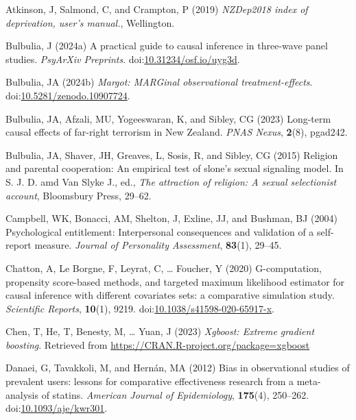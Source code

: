 \documentclass[
  single column]{article}
\newlength{\cslhangindent}
\newenvironment{CSLReferences}[2] %
 {\begin{list}{}{%
  \setlength{\itemindent}{0pt}
  \setlength{\leftmargin}{0pt}
  \setlength{\parsep}{0pt}
  \ifodd #1
   \setlength{\leftmargin}{\cslhangindent}
   \setlength{\itemindent}{-1\cslhangindent}
  \fi
  \setlength{\itemsep}{#2\baselineskip}}}
 {\end{list}}
\begin{document}
\label{refs}
\begin{CSLReferences}{1}{0}
Atkinson, J, Salmond, C, and Crampton, P (2019) \emph{NZDep2018 index of
deprivation, user{'}s manual.}, Wellington.

Bulbulia, J (2024a) A practical guide to causal inference in three-wave
panel studies. \emph{PsyArXiv Preprints}.
doi:\href{https://doi.org/10.31234/osf.io/uyg3d}{10.31234/osf.io/uyg3d}.

Bulbulia, JA (2024b) \emph{Margot: MARGinal observational
treatment-effects}.
doi:\href{https://doi.org/10.5281/zenodo.10907724}{10.5281/zenodo.10907724}.

Bulbulia, JA, Afzali, MU, Yogeeswaran, K, and Sibley, CG (2023)
Long-term causal effects of far-right terrorism in {N}ew {Z}ealand.
\emph{PNAS Nexus}, \textbf{2}(8), pgad242.

Bulbulia, JA, Shaver, JH, Greaves, L, Sosis, R, and Sibley, CG (2015)
Religion and parental cooperation: An empirical test of slone's sexual
signaling model. In S. J. D. amd Van Slyke J., ed., \emph{The attraction
of religion: A sexual selectionist account}, Bloomsbury Press, 29--62.

Campbell, WK, Bonacci, AM, Shelton, J, Exline, JJ, and Bushman, BJ
(2004) Psychological entitlement: Interpersonal consequences and
validation of a self-report measure. \emph{Journal of Personality
Assessment}, \textbf{83}(1), 29--45.

Chatton, A, Le Borgne, F, Leyrat, C, \ldots{} Foucher, Y (2020)
G-computation, propensity score-based methods, and targeted maximum
likelihood estimator for causal inference with different covariates
sets: a comparative simulation study. \emph{Scientific Reports},
\textbf{10}(1), 9219.
doi:\href{https://doi.org/10.1038/s41598-020-65917-x}{10.1038/s41598-020-65917-x}.

Chen, T, He, T, Benesty, M, \ldots{} Yuan, J (2023) \emph{Xgboost:
Extreme gradient boosting}. Retrieved from
\url{https://CRAN.R-project.org/package=xgboost}

Danaei, G, Tavakkoli, M, and Hernán, MA (2012) Bias in observational
studies of prevalent users: lessons for comparative effectiveness
research from a meta-analysis of statins. \emph{American Journal of
Epidemiology}, \textbf{175}(4), 250--262.
doi:\href{https://doi.org/10.1093/aje/kwr301}{10.1093/aje/kwr301}.


\end{CSLReferences}
\end{document}
